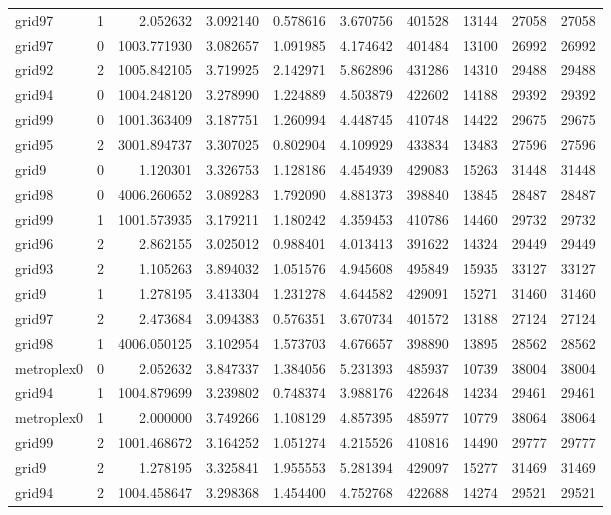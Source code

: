 \begin{longtable}{|l|r|r|r|r|r|r|r|r|r|}
grid97 & 1 & 2.052632 & 3.092140 & 0.578616 & 3.670756 & 401528 & 13144 & 27058 & 27058 \\
grid97 & 0 & 1003.771930 & 3.082657 & 1.091985 & 4.174642 & 401484 & 13100 & 26992 & 26992 \\
grid92 & 2 & 1005.842105 & 3.719925 & 2.142971 & 5.862896 & 431286 & 14310 & 29488 & 29488 \\
grid94 & 0 & 1004.248120 & 3.278990 & 1.224889 & 4.503879 & 422602 & 14188 & 29392 & 29392 \\
grid99 & 0 & 1001.363409 & 3.187751 & 1.260994 & 4.448745 & 410748 & 14422 & 29675 & 29675 \\
grid95 & 2 & 3001.894737 & 3.307025 & 0.802904 & 4.109929 & 433834 & 13483 & 27596 & 27596 \\
grid9 & 0 & 1.120301 & 3.326753 & 1.128186 & 4.454939 & 429083 & 15263 & 31448 & 31448 \\
grid98 & 0 & 4006.260652 & 3.089283 & 1.792090 & 4.881373 & 398840 & 13845 & 28487 & 28487 \\
grid99 & 1 & 1001.573935 & 3.179211 & 1.180242 & 4.359453 & 410786 & 14460 & 29732 & 29732 \\
grid96 & 2 & 2.862155 & 3.025012 & 0.988401 & 4.013413 & 391622 & 14324 & 29449 & 29449 \\
grid93 & 2 & 1.105263 & 3.894032 & 1.051576 & 4.945608 & 495849 & 15935 & 33127 & 33127 \\
grid9 & 1 & 1.278195 & 3.413304 & 1.231278 & 4.644582 & 429091 & 15271 & 31460 & 31460 \\
grid97 & 2 & 2.473684 & 3.094383 & 0.576351 & 3.670734 & 401572 & 13188 & 27124 & 27124 \\
grid98 & 1 & 4006.050125 & 3.102954 & 1.573703 & 4.676657 & 398890 & 13895 & 28562 & 28562 \\
metroplex0 & 0 & 2.052632 & 3.847337 & 1.384056 & 5.231393 & 485937 & 10739 & 38004 & 38004 \\
grid94 & 1 & 1004.879699 & 3.239802 & 0.748374 & 3.988176 & 422648 & 14234 & 29461 & 29461 \\
metroplex0 & 1 & 2.000000 & 3.749266 & 1.108129 & 4.857395 & 485977 & 10779 & 38064 & 38064 \\
grid99 & 2 & 1001.468672 & 3.164252 & 1.051274 & 4.215526 & 410816 & 14490 & 29777 & 29777 \\
grid9 & 2 & 1.278195 & 3.325841 & 1.955553 & 5.281394 & 429097 & 15277 & 31469 & 31469 \\
grid94 & 2 & 1004.458647 & 3.298368 & 1.454400 & 4.752768 & 422688 & 14274 & 29521 & 29521 \\

\end{longtable}
